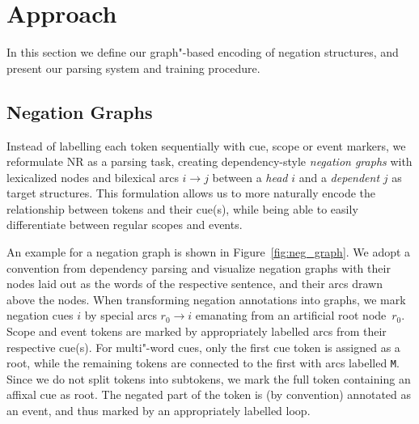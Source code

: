 \documentclass[11pt,a4paper]{article}
\theoremstyle{plain}
\begin{document}
\section{Approach}
\label{sec:model}
In this section we define our graph"-based encoding of negation structures, and present our parsing
system and training procedure.
\subsection{Negation Graphs}
Instead of labelling each token sequentially with cue, scope or event markers,
we reformulate NR as a parsing task, creating dependency-style
\emph{negation graphs} with lexicalized nodes and bilexical arcs $i \to j$ between a \emph{head} $i$ and a \emph{dependent} $j$ as target structures.
This formulation allows us to more naturally encode the relationship between tokens and
their cue(s), while being able to easily differentiate between regular scopes
and events.

An example for a negation graph is
shown in Figure~\ref{fig:neg_graph}.
We adopt a convention from dependency parsing and visualize negation graphs with their nodes laid out as the words
of the respective sentence, and their arcs drawn above the nodes.
When transforming negation annotations into graphs, we mark
negation cues $i$ by special arcs $r_0 \rightarrow i$ emanating from an artificial root node~$r_0$.
Scope and event tokens are marked by appropriately labelled arcs from their respective
cue(s).
For multi"-word cues, only the first cue token is assigned as a root,
while the remaining tokens are connected to the first with arcs
labelled \texttt{M}.
Since we do not split tokens into subtokens, we mark the full token containing
an affixal cue as root. 
The negated part of the token is (by convention) annotated as an event, and thus marked by an
appropriately labelled loop.
\end{document}
